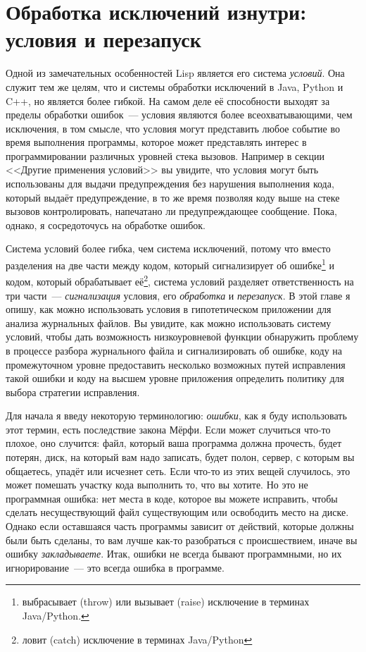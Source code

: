 \chapter{Обработка исключений изнутри: условия и перезапуск}
\label{ch:19}

Одной из замечательных особенностей Lisp является его система \textit{условий}. Она
служит тем же целям, что и системы обработки исключений в Java, Python и C++, но является
более гибкой. На самом деле её способности выходят за пределы обработки ошибок~--- условия
являются более всеохватывающими, чем исключения, в том смысле, что условия могут
представить любое событие во время выполнения программы, которое может представлять
интерес в программировании различных уровней стека вызовов. Например в секции <<Другие
применения условий>> вы увидите, что условия могут быть использованы для выдачи
предупреждения без нарушения выполнения кода, который выдаёт предупреждение, в то же время
позволяя коду выше на стеке вызовов контролировать, напечатано ли предупреждающее
сообщение. Пока, однако, я сосредоточусь на обработке ошибок.

Система условий более гибка, чем система исключений, потому что вместо разделения на две
части между кодом, который сигнализирует об ошибке\footnote{выбрасывает (throw) или
  вызывает (raise) исключение в терминах Java/Python.} и кодом, который обрабатывает
её\footnote{ловит (catch) исключение в терминах Java/Python}, система условий разделяет
ответственность на три части~--- \textit{сигнализация} условия, его \textit{обработка} и
\textit{перезапуск}. В этой главе я опишу, как можно использовать условия в гипотетическом
приложении для анализа журнальных файлов. Вы увидите, как можно использовать систему
условий, чтобы дать возможность низкоуровневой функции обнаружить проблему в процессе
разбора журнального файла и сигнализировать об ошибке, коду на промежуточном уровне
предоставить несколько возможных путей исправления такой ошибки и коду на высшем уровне
приложения определить политику для выбора стратегии исправления.

Для начала я введу некоторую терминологию: \textit{ошибки}, как я буду использовать этот
термин, есть последствие закона Мёрфи. Если может случиться что-то плохое, оно случится:
файл, который ваша программа должна прочесть, будет потерян, диск, на который вам надо
записать, будет полон, сервер, с которым вы общаетесь, упадёт или исчезнет сеть. Если
что-то из этих вещей случилось, это может помешать участку кода выполнить то, что вы
хотите. Но это не программная ошибка: нет места в коде, которое вы можете исправить, чтобы
сделать несуществующий файл существующим или освободить место на диске. Однако если
оставшаяся часть программы зависит от действий, которые должны были быть сделаны, то вам
лучше как-то разобраться с происшествием, иначе вы ошибку \textit{закладываете}. Итак,
ошибки не всегда бывают программными, но их игнорирование~--- это всегда ошибка в
программе.

